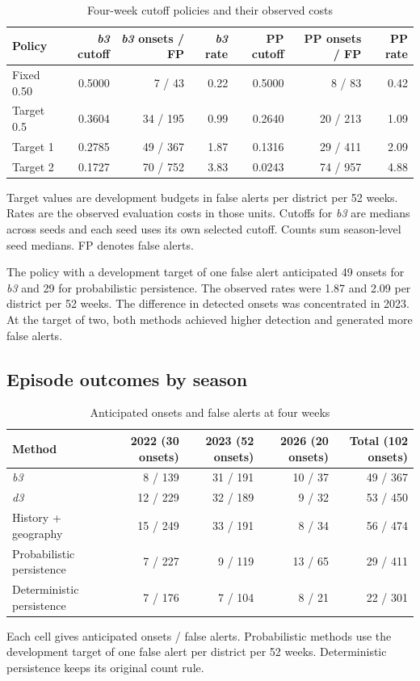 \documentclass[10pt]{article}
\newcommand{\bthree}{\textit{b3}}
\newcommand{\dthree}{\textit{d3}}
\begin{document}
\begin{table}[!h]
\centering
\caption{Four-week cutoff policies and their observed costs}
\small
\begin{tabular}{@{}lrrrrrr@{}}
\toprule
Policy & \bthree{} cutoff & \bthree{} onsets / FP & \bthree{} rate & PP cutoff & PP onsets / FP & PP rate\\
\midrule
Fixed 0.50 & 0.5000 & 7 / 43 & 0.22 & 0.5000 & 8 / 83 & 0.42\\
Target 0.5 & 0.3604 & 34 / 195 & 0.99 & 0.2640 & 20 / 213 & 1.09\\
Target 1 & 0.2785 & 49 / 367 & 1.87 & 0.1316 & 29 / 411 & 2.09\\
Target 2 & 0.1727 & 70 / 752 & 3.83 & 0.0243 & 74 / 957 & 4.88\\
\bottomrule
\end{tabular}

\vspace{2pt}\parbox{0.85\textwidth}{\footnotesize Target values are development budgets in false alerts per district per 52 weeks. Rates are the observed evaluation costs in those units. Cutoffs for \bthree{} are medians across seeds and each seed uses its own selected cutoff. Counts sum season-level seed medians. FP denotes false alerts.}
\end{table}

The policy with a development target of one false alert anticipated 49 onsets for \bthree{} and 29 for probabilistic persistence. The observed rates were 1.87 and 2.09 per district per 52 weeks. The difference in detected onsets was concentrated in 2023. At the target of two, both methods achieved higher detection and generated more false alerts.

\subsection*{Episode outcomes by season}
\begin{table}[!h]
\centering
\caption{Anticipated onsets and false alerts at four weeks}
\small
\begin{tabular}{@{}lrrrr@{}}
\toprule
Method & 2022 (30 onsets) & 2023 (52 onsets) & 2026 (20 onsets) & Total (102 onsets)\\
\midrule
\bthree{} & 8 / 139 & 31 / 191 & 10 / 37 & 49 / 367\\
\dthree{} & 12 / 229 & 32 / 189 & 9 / 32 & 53 / 450\\
History + geography & 15 / 249 & 33 / 191 & 8 / 34 & 56 / 474\\
Probabilistic persistence & 7 / 227 & 9 / 119 & 13 / 65 & 29 / 411\\
Deterministic persistence & 7 / 176 & 7 / 104 & 8 / 21 & 22 / 301\\
\bottomrule
\end{tabular}

\vspace{2pt}\parbox{0.85\textwidth}{\footnotesize Each cell gives anticipated onsets / false alerts. Probabilistic methods use the development target of one false alert per district per 52 weeks. Deterministic persistence keeps its original count rule.}
\end{table}
\end{document}
